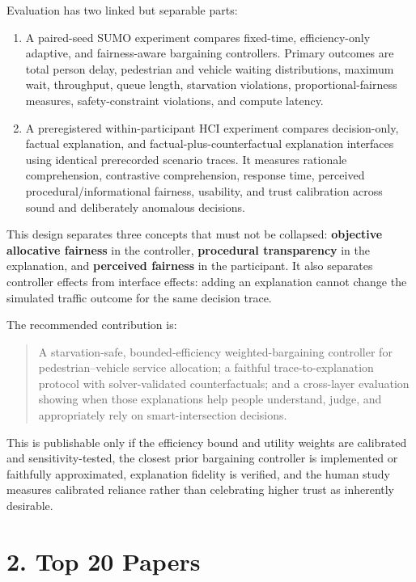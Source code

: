 \documentclass[
  english,
  11pt,
  a4paper,
]{article}
\providecommand{\tightlist}{%
  \setlength{\itemsep}{0pt}\setlength{\parskip}{0pt}}
\begin{document}
Evaluation has two linked but separable parts:

\begin{enumerate}
\def\labelenumi{\arabic{enumi}.}
\tightlist
\item
  A paired-seed SUMO experiment compares fixed-time, efficiency-only
  adaptive, and fairness-aware bargaining controllers. Primary outcomes
  are total person delay, pedestrian and vehicle waiting distributions,
  maximum wait, throughput, queue length, starvation violations,
  proportional-fairness measures, safety-constraint violations, and
  compute latency.
\item
  A preregistered within-participant HCI experiment compares
  decision-only, factual explanation, and factual-plus-counterfactual
  explanation interfaces using identical prerecorded scenario traces. It
  measures rationale comprehension, contrastive comprehension, response
  time, perceived procedural/informational fairness, usability, and
  trust calibration across sound and deliberately anomalous decisions.
\end{enumerate}

This design separates three concepts that must not be collapsed:
\textbf{objective allocative fairness} in the controller,
\textbf{procedural transparency} in the explanation, and
\textbf{perceived fairness} in the participant. It also separates
controller effects from interface effects: adding an explanation cannot
change the simulated traffic outcome for the same decision trace.

The recommended contribution is:

\begin{quote}
A starvation-safe, bounded-efficiency weighted-bargaining controller for
pedestrian--vehicle service allocation; a faithful trace-to-explanation
protocol with solver-validated counterfactuals; and a cross-layer
evaluation showing when those explanations help people understand,
judge, and appropriately rely on smart-intersection decisions.
\end{quote}

This is publishable only if the efficiency bound and utility weights are
calibrated and sensitivity-tested, the closest prior bargaining
controller is implemented or faithfully approximated, explanation
fidelity is verified, and the human study measures calibrated reliance
rather than celebrating higher trust as inherently desirable.

\section{2. Top 20 Papers}\label{top-20-papers}
\end{document}
